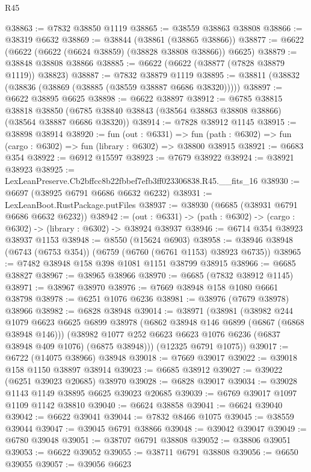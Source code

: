 \begin{lexlean}{R45}
\begin{coremodule}
{@38863 := @7832 @38850 @1119
@38865 := @38559 @38863 @38808
@38866 := @38319 @6632
@38869 := @38844 (@38861 (@38865 @38866))
@38877 := @6622 (@6622 (@6622 (@6624 @38859) (@38828 @38808 @38866)) @6625)
@38879 := @38848 @38808 @38866
@38885 := @6622 (@6622 (@38877 (@7828 @38879 @1119)) @38823)
@38887 := @7832 @38879 @1119
@38895 := @38811 (@38832 (@38836 (@38869 (@38885 (@38559 @38887 @6686 @38320)))))
@38897 := @6622 @38895 @6625
@38898 := @6622 @38897
@38912 := @6785
    @38815
    @38818
    @38850
    (@6785 @38840 @38843 (@38564 @38863 @38808 @38866) (@38564 @38887 @6686 @38320))
@38914 := @7828 @38912 @1145
@38915 := @38898 @38914
@38920 := fun (out : @6331) =>
  fun (path : @6302) => fun (cargo : @6302) => fun (library : @6302) => @38800 @38915
@38921 := @6683 @354
@38922 := @6912 @15597
@38923 := @7679 @38922
@38924 := @38921 @38923
@38925 := LexLeanPreserve.Cb2bffcc8b22fbbef7efb3ff023306838.R45.__fits_16
@38930 := @6697 (@38925 @6791 @6686 @6632 @6232)
@38931 := LexLeanBoot.RustPackage.putFiles
@38937 := @38930 (@6685 (@38931 @6791 @6686 @6632 @6232))
@38942 := (out : @6331) -> (path : @6302) -> (cargo : @6302) -> (library : @6302) -> @38924 @38937
@38946 := @6714 @354 @38923 @38937 @1153
@38948 := @8550 (@15624 @6903)
@38958 := @38946 @38948 (@6743 (@6753 @354)) (@6759 (@6760 (@6761 @1153) @38923 @6735))
@38965 := @7482 @38948 @158 @398 @1081 @1151 @38799 @38915
@38966 := @6685 @38827
@38967 := @38965 @38966
@38970 := @6685 (@7832 @38912 @1145)
@38971 := @38967 @38970
@38976 := @7669 @38948 @158 @1080 @6661 @38798
@38978 := @6251 @1076 @6236
@38981 := @38976 (@7679 @38978) @38966
@38982 := @6828 @38948
@39014 := @38971
    (@38981
      (@38982
        @244
        @1079
        @6623
        @6625
        @6899
        @38978
        (@6862 @38948 @146 @6899 (@6867 (@6868 @38948 @146)))
        (@38982 @1077 @252 @6623 @6623 @1076 @6236 (@6837 @38948 @409 @1076) (@6875 @38948)))
      (@12325 @6791 @1075))
@39017 := @6722 (@14075 @38966) @38948
@39018 := @7669 @39017
@39022 := @39018 @158 @1150 @38897 @38914
@39023 := @6685 @38912
@39027 := @39022 (@6251 @39023 @20685) @38970
@39028 := @6828 @39017
@39034 := @39028 @1143 @1149 @38895 @6625 @39023 @20685
@39039 := @6769 @39017 @1097 @1109 @1142 @38810
@39040 := @6624 @38858
@39041 := @6624 @39040
@39042 := @6622 @39041
@39044 := @7832 @8466 @1075
@39045 := @38559 @39044
@39047 := @39045 @6791 @38866
@39048 := @39042 @39047
@39049 := @6780 @39048
@39051 := @38707 @6791 @38808
@39052 := @38806 @39051
@39053 := @6622 @39052
@39055 := @38711 @6791 @38808
@39056 := @6650 @39055
@39057 := @39056 @6623
}
\end{coremodule}
\end{lexlean}
